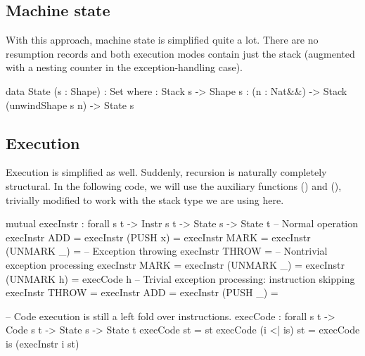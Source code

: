 \subsection{Machine state}

With this approach, machine state is simplified quite a lot. There are no
resumption records and both execution modes contain just the stack (augmented
with a nesting counter in the exception-handling case).

\begin{code}
  data State (s : Shape) : Set where
    \tick[_] : Stack s -> Shape s
    \x[_,_] : (n : Nat&\!&) -> Stack (unwindShape s n) -> State s
\end{code}

\subsection{Execution}

Execution is simplified as well.  Suddenly, recursion is naturally completely
structural. In the following code, we will use the auxiliary functions
 () and 
(), trivially modified to work with the stack type we
are using here.

\begin{codei}
  mutual
    execInstr : forall {s t} -> Instr s t -> State s -> State t
  	-- Normal operation
    execInstr ADD 					= \tick[ (x + y) \scons st ]
    execInstr (PUSH x)			\tick[ st ] 		= \tick[ x \scons st ]
    execInstr MARK				\tick[ st ] 		= 
    execInstr (UNMARK _)			= \tick[ x \scons st ]
    -- Exception throwing  
    execInstr THROW				\tick[ st ] =  
    -- Nontrivial exception processing
    execInstr MARK				\x[ n	 , st	] = \x[ suc n, st ]
    execInstr (UNMARK _)		\x[ suc n , st	] = \x[ n	, st ]
    execInstr (UNMARK h)		\x[ zero	 , st	] = execCode h \tick[ st ]
    -- Trivial exception processing: instruction skipping
    execInstr THROW			\x[ n , st ] = \x[ n , st ]
    execInstr ADD			\x[ n , st ] = \x[ n , st ]
    execInstr (PUSH _)		\x[ n , st ] = \x[ n , st ]
\end{codei}
\begin{code}
    -- Code execution is still a left fold over instructions.
    execCode : forall {s t} -> Code s t -> State s -> State t
    execCode \nil st = st
    execCode (i <| is) st = execCode is (execInstr i st)
\end{code}

